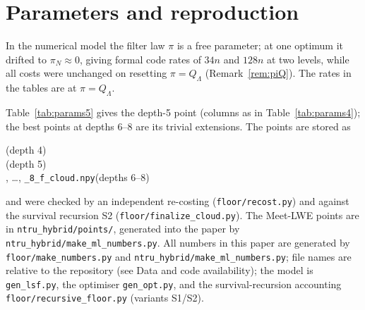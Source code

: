 \documentclass[11pt]{article}
\theoremstyle{definition}
\theoremstyle{remark}
\newif\ifincludemeetlwe \includemeetlwetrue  %
\begin{document}
\appendix
\section{Parameters and reproduction}\label{app:repro}
In the numerical model the filter law $\pi$ is a free parameter; at one optimum it drifted to $\pi_N\approx0$, giving
formal code rates of $34n$ and $128n$ at two levels, while all costs were unchanged on resetting $\pi=Q_\Lambda$
(Remark~\ref{rem:piQ}). The rates in the tables are at $\pi=Q_\Lambda$.

Table~\ref{tab:params5} gives the depth-5 point (columns as in Table~\ref{tab:params4}); the best points at depths
$6$--$8$ are its trivial extensions. The points are stored as
\begin{center}\small\texttt{\Srcfour}\quad(depth 4)\\ \texttt{\Srcfive}\quad(depth 5)\\
\texttt{\Srcsix}, \dots, \texttt{\_8\_f\_cloud.npy}\quad(depths 6--8)\end{center}
and were checked by an independent re-costing (\texttt{floor/recost.py}) and against the survival recursion S2
(\texttt{floor/finalize\_cloud.py}). The Meet-LWE points are in \texttt{ntru\_hybrid/points/}, generated into the paper
by \texttt{ntru\_hybrid/make\_ml\_numbers.py}.
All numbers in this paper are generated by
\texttt{floor/make\_numbers.py}\ifincludemeetlwe{} and \texttt{ntru\_hybrid/make\_ml\_numbers.py}\fi; file names are
relative to the repository (see Data and code availability); the model is \texttt{gen\_lsf.py}, the optimiser \texttt{gen\_opt.py}, and the
survival-recursion accounting \texttt{floor/recursive\_floor.py} (variants S1/S2).
\begin{table}[ht]
\centering\small

\caption{The depth-5 point, the best computed.}\label{tab:params5}
\end{table}
\end{document}
